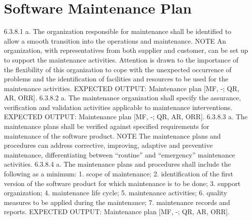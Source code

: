 \chapter{Software Maintenance Plan}
\label{chapter:maintenance}

6.3.8.1
a. The organization responsible for maintenance shall be identified to allow a smooth transition into the operations and maintenance.
NOTE An organization, with representatives from both supplier and customer, can be set up to support the maintenance activities. Attention is drawn to the importance of the flexibility of this organization to cope with the unexpected occurrence of problems and the identification of facilities and resources to be used for the maintenance activities.
EXPECTED OUTPUT: Maintenance plan [MF, -; QR, AR, ORR].
6.3.8.2
a. The maintenance organization shall specify the assurance, verification and validation activities applicable to maintenance interventions.
EXPECTED OUTPUT: Maintenance plan [MF, -; QR, AR, ORR].
6.3.8.3
a. The maintenance plans shall be verified against specified requirements for maintenance of the software product.
NOTE The maintenance plans and procedures can address corrective, improving, adaptive and preventive maintenance, differentiating between “routine” and “emergency” maintenance activities.
6.3.8.4
a. The maintenance plans and procedures shall include the following as a minimum:
1. scope of maintenance;
2. identification of the first version of the software product for which maintenance is to be done;
3. support organization;
4. maintenance life cycle;
5. maintenance activities;
6. quality measures to be applied during the maintenance;
7. maintenance records and reports.
EXPECTED OUTPUT: Maintenance plan [MF, -; QR, AR, ORR].



